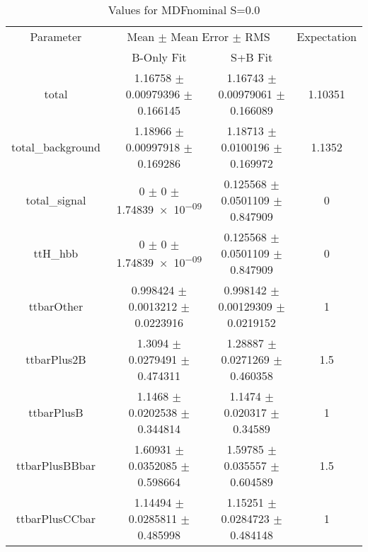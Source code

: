 \begin{table}
\centering
\caption{Values for MDFnominal S=0.0}
\begin{tabular}{cccc}
\toprule
Parameter & \multicolumn{2}{c}{Mean $\pm$ Mean Error $\pm$ RMS} & Expectation\\
 & B-Only Fit & S+B Fit & \\
\midrule
total & \num{1.16758} $\pm$ \num{0.00979396} $\pm$ \num{0.166145} & \num{1.16743} $\pm$ \num{0.00979061} $\pm$ \num{0.166089} & \num{1.10351}\\
total\_background & \num{1.18966} $\pm$ \num{0.00997918} $\pm$ \num{0.169286} & \num{1.18713} $\pm$ \num{0.0100196} $\pm$ \num{0.169972} & \num{1.1352}\\
total\_signal & \num{0} $\pm$ \num{0} $\pm$ \num{1.74839e-09} & \num{0.125568} $\pm$ \num{0.0501109} $\pm$ \num{0.847909} & \num{0}\\
ttH\_hbb & \num{0} $\pm$ \num{0} $\pm$ \num{1.74839e-09} & \num{0.125568} $\pm$ \num{0.0501109} $\pm$ \num{0.847909} & \num{0}\\
ttbarOther & \num{0.998424} $\pm$ \num{0.0013212} $\pm$ \num{0.0223916} & \num{0.998142} $\pm$ \num{0.00129309} $\pm$ \num{0.0219152} & \num{1}\\
ttbarPlus2B & \num{1.3094} $\pm$ \num{0.0279491} $\pm$ \num{0.474311} & \num{1.28887} $\pm$ \num{0.0271269} $\pm$ \num{0.460358} & \num{1.5}\\
ttbarPlusB & \num{1.1468} $\pm$ \num{0.0202538} $\pm$ \num{0.344814} & \num{1.1474} $\pm$ \num{0.020317} $\pm$ \num{0.34589} & \num{1}\\
ttbarPlusBBbar & \num{1.60931} $\pm$ \num{0.0352085} $\pm$ \num{0.598664} & \num{1.59785} $\pm$ \num{0.035557} $\pm$ \num{0.604589} & \num{1.5}\\
ttbarPlusCCbar & \num{1.14494} $\pm$ \num{0.0285811} $\pm$ \num{0.485998} & \num{1.15251} $\pm$ \num{0.0284723} $\pm$ \num{0.484148} & \num{1}\\
\bottomrule
\end{tabular}
\end{table}